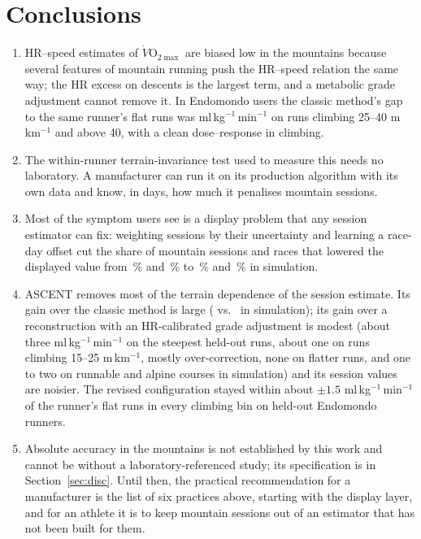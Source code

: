 \documentclass[11pt,a4paper]{article}
\newcommand{\VOmax}{\ensuremath{\dot V\mathrm{O}_{2\max}}}
\newcommand{\unit}{ml\,kg$^{-1}$\,min$^{-1}$}
\newcommand{\ascent}{ASCENT}
\begin{document}
\section{Conclusions}
\begin{enumerate}[leftmargin=*]
\item HR--speed estimates of \VOmax{} are biased low in the mountains because several features of mountain running push the HR--speed relation the same way; the HR excess on descents is the largest term, and a metabolic grade adjustment cannot remove it. In \nnFitrecRunners{} Endomondo users the classic method's gap to the same runner's flat runs was \nfrTrimCGflat{} \unit{} on runs climbing 25--40 m\,km$^{-1}$ and \nfrTrimDGflat{} above 40, with a clean dose--response in climbing.
\item The within-runner terrain-invariance test used to measure this needs no laboratory. A manufacturer can run it on its production algorithm with its own data and know, in days, how much it penalises mountain sessions.
\item Most of the symptom users see is a display problem that any session estimator can fix: weighting sessions by their uncertainty and learning a race-day offset cut the share of mountain sessions and races that lowered the displayed value from \nlongDropMtnGarmin\,\% and \nlongDropRaceGarmin\,\% to \nlongDropMtnRace\,\% and \nlongDropRaceRace\,\% in simulation.
\item \ascent{} removes most of the terrain dependence of the session estimate. Its gain over the classic method is large (\nbiasASCENTmountain{} vs.\ \nbiasGflatmountain{} in simulation); its gain over a reconstruction with an HR-calibrated grade adjustment is modest (about three \unit{} on the steepest held-out runs, about one on runs climbing 15--25 m\,km$^{-1}$, mostly over-correction, none on flatter runs, and one to two on runnable and alpine courses in simulation) and its session values are noisier. The revised configuration stayed within about $\pm1.5$ \unit{} of the runner's flat runs in every climbing bin on held-out Endomondo runners.
\item Absolute accuracy in the mountains is not established by this work and cannot be without a laboratory-referenced study; its specification is in Section~\ref{sec:disc}. Until then, the practical recommendation for a manufacturer is the list of six practices above, starting with the display layer, and for an athlete it is to keep mountain sessions out of an estimator that has not been built for them.
\end{enumerate}
\end{document}
